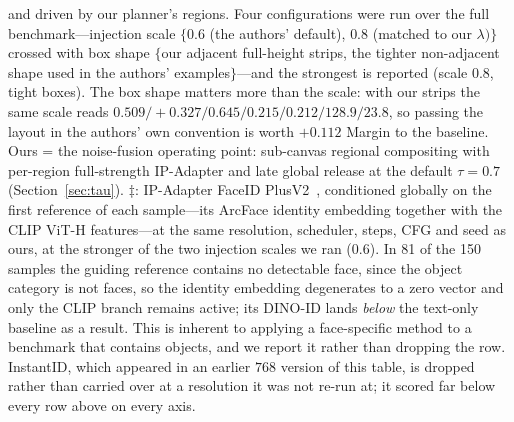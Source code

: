 \documentclass[10pt,twocolumn,letterpaper]{article}
\begin{document}
\begin{table}[htbp]
{  and driven by our planner's regions.  Four configurations were run over the
  full benchmark---injection scale $\{0.6$ (the authors' default), $0.8$
  (matched to our $\lambda)\}$ crossed with box shape $\{$our adjacent
  full-height strips, the tighter non-adjacent shape used in the authors'
  examples$\}$---and the strongest is reported (scale $0.8$, tight boxes).
  The box shape matters more than the scale: with our strips the same scale
  reads $0.509/{+}0.327/0.645/0.215/0.212/128.9/23.8$, so passing the layout
  in the authors' own convention is worth $+0.112$ Margin to the baseline.
  Ours = the noise-fusion operating point: sub-canvas regional compositing
  with per-region full-strength
  IP-Adapter and late global release at the default $\tau{=}0.7$
  (Section~\ref{sec:tau}).
  $\ddagger$: IP-Adapter FaceID PlusV2~\cite{ye2023ip}, conditioned globally
  on the first reference of each sample---its ArcFace identity embedding
  together with the CLIP ViT-H features---at the same resolution, scheduler,
  steps, CFG and seed as ours, at the stronger of the two injection scales we
  ran ($0.6$).  In 81 of the 150 samples the guiding reference contains no
  detectable face, since the object category is not faces, so the identity
  embedding degenerates to a zero vector and only the CLIP branch remains
  active; its DINO-ID lands \emph{below} the text-only baseline as a result.
  This is inherent to applying a face-specific method to a benchmark that
  contains objects, and we report it rather than dropping the row.
  InstantID, which appeared in an earlier $768$ version of this table, is
  dropped rather than carried over at a resolution it was not re-run at; it
  scored far below every row above on every axis.
}
\label{tab:main}
\end{table}
\end{document}
